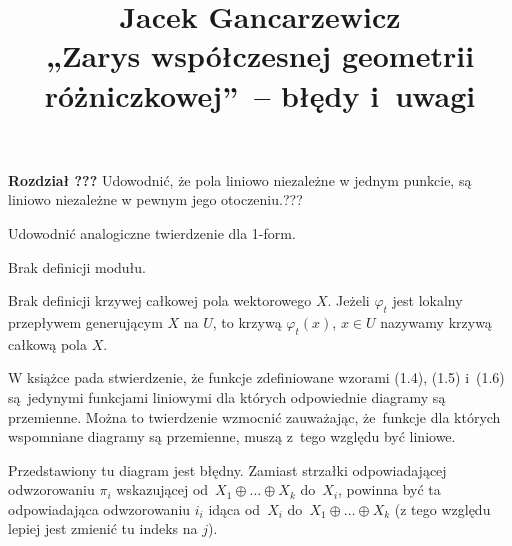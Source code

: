 \documentclass[a4paper,11pt]{article}
\title{ %
  Jacek Gancarzewicz \\
  „Zarys współczesnej geometrii różniczkowej”~-- błędy i~uwagi}
\begin{document}





\maketitle %





\noindent
\textbf{Rozdział ???} \Dok \start Udowodnić, że pola liniowo
niezależne w jednym punkcie, są liniowo niezależne w pewnym jego
otoczeniu.???

\vspace{\spaceFour}



\start Udowodnić analogiczne twierdzenie dla 1-form.

\vspace{\spaceFour}



\start Brak definicji modułu.

\vspace{\spaceFour}



\start Brak definicji krzywej całkowej pola wektorowego $X$. Jeżeli
$\varphi_{ t }$ jest lokalny przepływem generującym $X$ na $U$, to
krzywą $\varphi_{ t }( x )$, $x \in U$ nazywamy krzywą całkową pola $X$.

\vspace{\spaceFour}



\start {} W książce pada stwierdzenie, że funkcje zdefiniowane
wzorami (1.4), (1.5) i~(1.6) są~jedynymi funkcjami liniowymi dla
których odpowiednie diagramy są przemienne. Można to twierdzenie
wzmocnić zauważając, że~funkcje dla których wspomniane diagramy są
przemienne, muszą z~tego względu być liniowe.

\vspace{\spaceFour}



\start {} Przedstawiony tu diagram jest błędny. Zamiast strzałki
odpowiadającej odwzorowaniu $\pi_{ i }$ wskazującej
od~$X_{ 1 } \oplus \ldots \oplus X_{ k }$ do~$X_{ i }$, powinna być ta odpowiadająca
odwzorowaniu $i_{ i }$ idąca od~$X_{ i }$
do~$X_{ 1 } \oplus \ldots \oplus X_{ k }$ (z tego względu lepiej jest zmienić tu
indeks na $j$).
\end{document}

